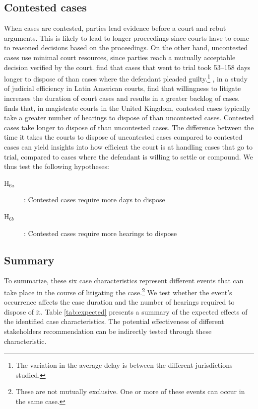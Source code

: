 \documentclass[12pt,a4paper]{article}
\begin{document}
		\subsection{Contested cases}
		\label{sec:contested_cases_meth}
		When cases are contested, parties lead evidence before a court and rebut arguments. This is likely to lead to longer proceedings since courts have to come to reasoned decisions based on the proceedings. On the other hand, uncontested cases use minimal court resources, since parties reach a mutually acceptable decision verified by the court. \textcite{ostrom2000efficiency} find that cases that went to trial took 53--158 days longer to dispose of than cases where the defendant pleaded guilty.\footnote{The variation in the average delay is between the different jurisdictions studied.} \textcite{buscaglia1997_latinAmericaCourtDelays}, in a study of judicial efficiency in Latin American courts, find that willingness to litigate increases the duration of court cases and results in a greater backlog of cases. \textcite{crownProsecutionService2006_magistrateCourtEfficiency} finds that, in magistrate courts in the United Kingdom, contested cases typically take a greater number of hearings to dispose of than uncontested cases. Contested cases take longer to dispose of than uncontested cases. The difference between the time it takes the courts to dispose of uncontested cases compared to contested cases can yield insights into how efficient the court is at handling cases that go to trial, compared to cases where the defendant is willing to settle or compound. We thus test the following hypotheses:
		
		\begin{description}
			\item[H$_{6a}$]: Contested cases require more days to dispose
			\item[H$_{6b}$]: Contested cases require more hearings to dispose
		\end{description}
		
		\subsection{Summary}
		
		To summarize, these six case characteristics represent different events that can take place in the course of litigating the case.\footnote{These are not mutually exclusive. One or more of these events can occur in the same case.} We test whether the event's occurrence affects the case duration and the number of hearings required to dispose of it. Table \ref{tab:expected} presents a summary of the expected effects of the identified case characteristics. The potential effectiveness of different stakeholders recommendation can be indirectly tested through these characteristic. 
		
\end{document}
